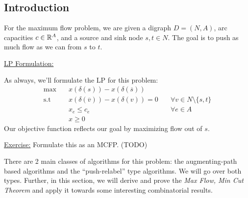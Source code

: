 \subsection{Introduction}
For the maximum flow problem, we are given a digraph $D = (N,A)$, arc capacities $c \in \mathbb{R}^A$, and a source and sink node $s,t \in N$.
The goal is to push as much flow as we can from $s$ to $t$.

\underline{LP Formulation:}

As always, we'll formulate the LP for this problem:
\begin{equation}\label{eq:max-flow_lp-formulation}
\begin{aligned}
      \max \quad &x(\delta(s)) - x(\delta(\overline{s}))\\
      \text{s.t} \quad &x(\delta(\overline{v})) - x(\delta(v)) = 0 \quad&\forall v \in N \setminus \{s, t\}\\
      &x_e \leq c_e \quad &\forall e \in A \\
      &x \geq 0
\end{aligned}
\end{equation}
Our objective function reflects our goal by maximizing flow out of $s$.

\underline{Exercise:} Formulate this as an MCFP. (TODO)

There are 2 main classes of algorithms for this problem: the augmenting-path based algorithms and the ``push-relabel'' type algorithms.
We will go over both types. 
Further, in this section, we will derive and prove the \textit{Max Flow, Min Cut Theorem} and apply it towards some interesting combinatorial results.
